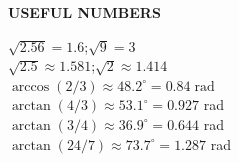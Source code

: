 \documentclass[6pt,letterpaper]{article}
\newcommand{\shead}[3]{%
  \noindent\colorbox{#1}{\parbox{\dimexpr\linewidth-2\fboxsep\relax}%
  {\color{#2}\bfseries\fontsize{6}{7}\selectfont #3}}\vspace{0.5pt}}
\begin{document}
\begin{minipage}[t]{0.19\linewidth}
\shead{bluebg}{blue}{USEFUL NUMBERS}
\begin{ebox}
$\sqrt{2.56}=1.6$;\;$\sqrt{9}=3$\\
$\sqrt{2.5}\approx1.581$;\;$\sqrt{2}\approx1.414$\\
$\arccos(2/3)\approx48.2^\circ=0.84\;\text{rad}$\\
$\arctan(4/3)\approx53.1^\circ=0.927$ rad\\
$\arctan(3/4)\approx36.9^\circ=0.644$ rad\\
$\arctan(24/7)\approx73.7^\circ=1.287$ rad
\end{ebox}
\end{minipage}
\end{document}
